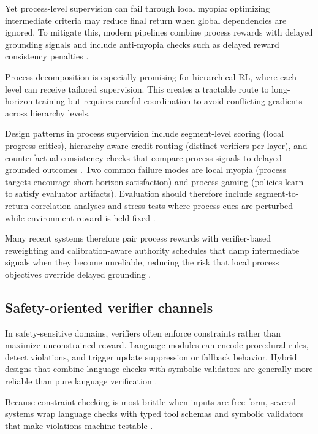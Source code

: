 ﻿\documentclass[conference]{IEEEtran}
\begin{document}
Yet process-level supervision can fail through local myopia: optimizing intermediate criteria may reduce final return when global dependencies are ignored. To mitigate this, modern pipelines combine process rewards with delayed grounding signals and include anti-myopia checks such as delayed reward consistency penalties \cite{arxiv_p_2510_20867,doi_p_10_48448_0js4_fm43,arxiv_p_2602_11551}.

Process decomposition is especially promising for hierarchical RL, where each level can receive tailored supervision. This creates a tractable route to long-horizon training but requires careful coordination to avoid conflicting gradients across hierarchy levels.

Design patterns in process supervision include segment-level scoring (local progress critics), hierarchy-aware credit routing (distinct verifiers per layer), and counterfactual consistency checks that compare process signals to delayed grounded outcomes \cite{arxiv_p_2510_20867,arxiv_p_2602_11551,doi_p_10_48448_0js4_fm43}. Two common failure modes are local myopia (process targets encourage short-horizon satisfaction) and process gaming (policies learn to satisfy evaluator artifacts). Evaluation should therefore include segment-to-return correlation analyses and stress tests where process cues are perturbed while environment reward is held fixed \cite{arxiv_p_2602_12579,arxiv_p_2602_02395,arxiv_p_2601_06845}.

Many recent systems therefore pair process rewards with verifier-based reweighting and calibration-aware authority schedules that damp intermediate signals when they become unreliable, reducing the risk that local process objectives override delayed grounding \cite{arxiv_p_2602_06493,arxiv_p_2508_03680}.

\subsection{Safety-oriented verifier channels}
In safety-sensitive domains, verifiers often enforce constraints rather than maximize unconstrained reward. Language modules can encode procedural rules, detect violations, and trigger update suppression or fallback behavior. Hybrid designs that combine language checks with symbolic validators are generally more reliable than pure language verification \cite{arxiv_p_2512_05686,arxiv_p_2602_09367,arxiv_p_2602_13156}.

Because constraint checking is most brittle when inputs are free-form, several systems wrap language checks with typed tool schemas and symbolic validators that make violations machine-testable \cite{doi_p_10_3390_make8010022,arxiv_p_2602_03022}.
\end{document}
